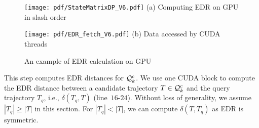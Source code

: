 \documentclass[10pt,conference,letterpaper]{IEEEtran}
\newcommand{\simcand}{{{\cal Q}_k^c}\xspace}
\newcommand{\edr}{{\delta}\xspace}
\begin{document}
\begin{figure}[t]
	\centering
	\scriptsize{
		\begin{minipage}{0.57\linewidth}
			\centering
			\texttt{[image: pdf/StateMatrixDP\_V6.pdf]}
			(a) Computing EDR on GPU in slash order
		\end{minipage}
		\hfill
		\begin{minipage}{0.42\linewidth}
			\centering
			\texttt{[image: pdf/EDR\_fetch\_V6.pdf]}
			(b) Data accessed by CUDA threads
		\end{minipage}
	}
	\caption{An example of EDR calculation on GPU\label{fig:EDR}}
	\vspace{-.1in}
\end{figure}

This step computes EDR distances for $\simcand$.
We use one CUDA block to compute the EDR distance between a candidate trajectory $T\in\simcand$ and the query trajectory $T_q$, i.e., $\edr(T_q, T)$ (line~$16$-$24$).
Without loss of generality, we assume $|T_q|\geq |T|$ in this section.
For $|T_q|<|T|$, we can compute $\edr(T,T_q)$ as EDR is symmetric.
\end{document}
